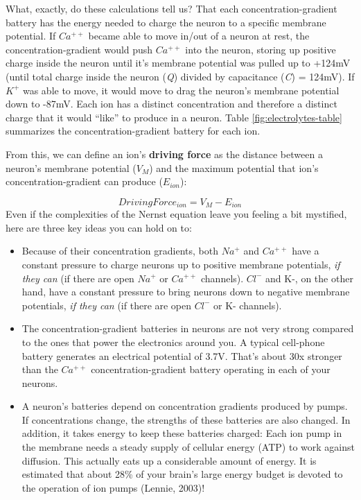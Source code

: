 \documentclass[
]{book}
\providecommand{\tightlist}{%
  \setlength{\itemsep}{0pt}\setlength{\parskip}{0pt}}
\begin{document}
What, exactly, do these calculations tell us? That each concentration-gradient battery has the energy needed to charge the neuron to a specific membrane potential. If \(Ca^{++}\) became able to move in/out of a neuron at rest, the concentration-gradient would push \(Ca^{++}\) into the neuron, storing up positive charge inside the neuron until it's membrane potential was pulled up to +124mV (until total charge inside the neuron (\emph{Q}) divided by capacitance (\emph{C}) = 124mV). If \(K^+\) was able to move, it would move to drag the neuron's membrane potential down to -87mV. Each ion has a distinct concentration and therefore a distinct charge that it would ``like'' to produce in a neuron. Table \ref{fig:electrolytes-table} summarizes the concentration-gradient battery for each ion.

From this, we can define an ion's \textbf{driving force} as the distance between a neuron's membrane potential (\(V_{M}\)) and the maximum potential that ion's concentration-gradient can produce (\(E_{ion}\)):

\[DrivingForce_{ion} = V_{M} - E_{ion}\]
Even if the complexities of the Nernst equation leave you feeling a bit mystified, here are three key ideas you can hold on to:

\begin{itemize}
\tightlist
\item
  Because of their concentration gradients, both \(Na^+\) and \(Ca^{++}\) have a constant pressure to charge neurons up to positive membrane potentials, \emph{if they can} (if there are open \(Na^+\) or \(Ca^{++}\) channels). \(Cl^{-}\) and K-, on the other hand, have a constant pressure to bring neurons down to negative membrane potentials, \emph{if they can} (if there are open \(Cl^{-}\) or K- channels).
\item
  The concentration-gradient batteries in neurons are not very strong compared to the ones that power the electronics around you. A typical cell-phone battery generates an electrical potential of 3.7V. That's about 30x stronger than the \(Ca^{++}\) concentration-gradient battery operating in each of your neurons.
\item
  A neuron's batteries depend on concentration gradients produced by pumps. If concentrations change, the strengths of these batteries are also changed. In addition, it takes energy to keep these batteries charged: Each ion pump in the membrane needs a steady supply of cellular energy (ATP) to work against diffusion. This actually eats up a considerable amount of energy. It is estimated that about 28\% of your brain's large energy budget is devoted to the operation of ion pumps (Lennie, 2003)!
\end{itemize}
\end{document}
